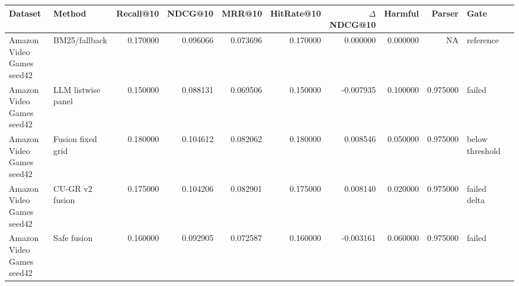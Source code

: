 \begin{tabular}{llrrrrrrrll}
\toprule
Dataset & Method & Recall@10 & NDCG@10 & MRR@10 & HitRate@10 & $\Delta$NDCG@10 & Harmful & Parser & Gate \\
\midrule
Amazon Video Games seed42 & BM25/fallback & 0.170000 & 0.096066 & 0.073696 & 0.170000 & 0.000000 & 0.000000 & NA & reference \\
Amazon Video Games seed42 & LLM listwise panel & 0.150000 & 0.088131 & 0.069506 & 0.150000 & -0.007935 & 0.100000 & 0.975000 & failed \\
Amazon Video Games seed42 & Fusion fixed grid & 0.180000 & 0.104612 & 0.082062 & 0.180000 & 0.008546 & 0.050000 & 0.975000 & below threshold \\
Amazon Video Games seed42 & CU-GR v2 fusion & 0.175000 & 0.104206 & 0.082901 & 0.175000 & 0.008140 & 0.020000 & 0.975000 & failed delta \\
Amazon Video Games seed42 & Safe fusion & 0.160000 & 0.092905 & 0.072587 & 0.160000 & -0.003161 & 0.060000 & 0.975000 & failed \\
\bottomrule
\end{tabular}

